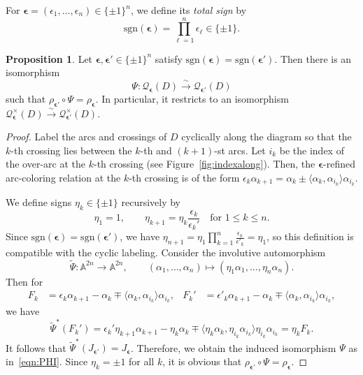 \documentclass[12pt,reqno]{amsart}
\newcommand{\BA}{\mathbb{A}}
\theoremstyle{definition}
\newtheorem{proposition}[theorem]{Proposition}
\begin{document}
	
	For $\boldsymbol{\epsilon} =(\epsilon_1,\dots,\epsilon_n)\in \{ \pm 1\}^n$, we define its \emph{total sign} by
	\[
	\mathrm{sgn}(\boldsymbol{\epsilon}) = \prod_{\ell=1}^n \epsilon_\ell \in \{\pm1\}.
	\]
	
	\begin{proposition} \label{prop:Qebijection}
		Let	$\boldsymbol{\epsilon},\boldsymbol{\epsilon}' \in\{\pm1\}^n$ satisfy $\mathrm{sgn}(\boldsymbol{\epsilon})	= \mathrm{sgn}(\boldsymbol{\epsilon}')$. Then there is an isomorphism 
		\begin{equation} \label{eqn:PHI}
			\Psi : \mathcal Q_{\boldsymbol{\epsilon}}(D) \xrightarrow{\sim}
			\mathcal Q_{\boldsymbol{\epsilon}'}(D)
		\end{equation}
		such that $\rho_{\boldsymbol{\epsilon}'} \circ \Psi = \rho_{\boldsymbol{\epsilon}}$.
		In particular, it restricts to an isomorphism $\mathcal Q_{\boldsymbol{\epsilon}}^\times(D) \xrightarrow{\sim}
		\mathcal Q_{\boldsymbol{\epsilon}'}^\times(D)$.
	\end{proposition}
	
	\begin{proof}
		Label the arcs and crossings of $D$ cyclically along the diagram so that the $k$-th crossing lies between the $k$-th and $(k+1)$-st arcs. Let $i_k$ be the index of the over-arc at the $k$-th crossing (see Figure~\ref{fig:indexalong}). Then, the $\boldsymbol{\epsilon}$-refined arc-coloring relation at the $k$-th crossing is of the form $\epsilon_k\alpha_{k+1} = \alpha_k \pm \langle \alpha_k, \alpha_{i_k} \rangle \alpha_{i_k}$.
        
		We define signs $\eta_k \in\{\pm1\}$ recursively by
		\[
		\eta_1=1, \qquad \eta_{k+1} 	= \eta_k \frac{\epsilon_k}{\epsilon_k'}	\quad	\text{for }	1\leq k\leq n.
		\]
		Since $\mathrm{sgn}(\boldsymbol{\epsilon})	= \mathrm{sgn}(\boldsymbol{\epsilon}')$, we have
		$\eta_{n+1} = \eta_1 \prod_{k=1}^n\frac{\epsilon_k}{\epsilon'_k} = \eta_1$, 
		so this definition is compatible with the cyclic labeling. Consider the involutive automorphism
		\[
		      \widetilde{\Psi}:  \BA^{2n} \rightarrow \BA^{2n}, \qquad  (\alpha_1,\ldots,\alpha_n) \longmapsto (\eta_1 \alpha_1,\ldots,\eta_n \alpha_n).
		\]
		Then for 
        \begin{align*}
            F_k &= 	\epsilon_k \alpha_{k+1}	-	\alpha_k 	\mp 	\langle \alpha_k, \alpha_{i_k} 	\rangle\alpha_{i_k}, & 
            F_k' &=	\epsilon'_k \alpha_{k+1}	-	\alpha_k 	\mp 	\langle \alpha_k, \alpha_{i_k} 	\rangle\alpha_{i_k},
        \end{align*} 
		we have
		  \[
		      \widetilde{\Psi}^\ast(F_k') = \epsilon_k'\eta_{k+1} \alpha_{k+1} - \eta_k \alpha_k \mp \langle \eta_k \alpha_k, \eta_{i_k} \alpha_{i_k} \rangle \eta_{i_k}\alpha_{i_k} = \eta_k F_k.
		\]
		It follows that $\widetilde{\Psi}^\ast (J_{\boldsymbol{\epsilon}'}) = J_{\boldsymbol{\epsilon}}$. Therefore, we obtain the induced isomorphism $\Psi$ as in~\eqref{eqn:PHI}.  Since $\eta_k = \pm1$ for all $k$, it is obvious that 
		$ \rho_{\boldsymbol{\epsilon}'} \circ \Psi = \rho_{\boldsymbol{\epsilon}}$.
	\end{proof}
		
\end{document}
